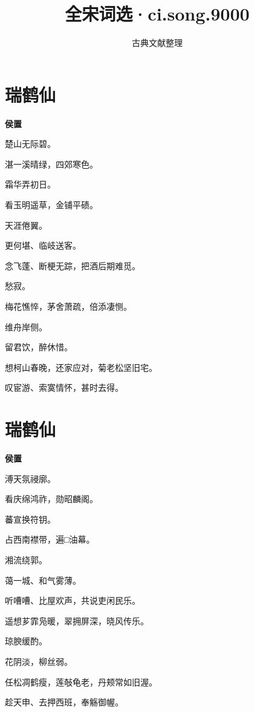 \documentclass[12pt,a4paper]{ctexbook}
\title{全宋词选·ci.song.9000}
\author{古典文献整理}
\date{}
\begin{document}
\maketitle
\tableofcontents
\newpage
\section{瑞鹤仙}
\textbf{侯置}\par\vspace{0.5em}
楚山无际碧。\par
湛一溪晴绿，四郊寒色。\par
霜华弄初日。\par
看玉明遥草，金铺平碛。\par
天涯倦翼。\par
更何堪、临岐送客。\par
念飞蓬、断梗无踪，把酒后期难觅。\par
愁寂。\par
梅花憔悴，茅舍萧疏，倍添凄恻。\par
维舟岸侧。\par
留君饮，醉休惜。\par
想柯山春晚，还家应对，菊老松坚旧宅。\par
叹宦游、索寞情怀，甚时去得。\par

\section{瑞鹤仙}
\textbf{侯置}\par\vspace{0.5em}
溥天氛祲廓。\par
看庆绵鸿祚，勋昭麟阁。\par
蕃宣换符钥。\par
占西南襟带，遍□油幕。\par
湘流绕郭。\par
蔼一城、和气雾薄。\par
听嘈嘈、比屋欢声，共说吏闲民乐。\par
遥想芗霏凫暖，翠拥屏深，晓风传乐。\par
琼腴缓酌。\par
花阴淡，柳丝弱。\par
任松凋鹤瘦，莲敧龟老，丹颊常如旧渥。\par
趁天申、去押西班，奉觞御幄。\par
\end{document}

